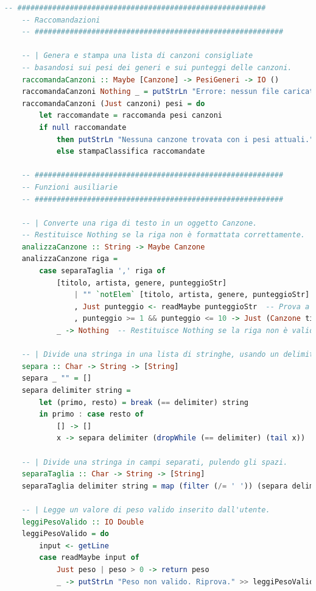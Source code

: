 \documentclass[a4paper,11pt]{article}
\begin{document}
\begin{lstlisting}[language=Haskell,caption=raccomandazioni.hs]
    -- #########################################################
    -- Raccomandazioni
    -- #########################################################
    
    -- | Genera e stampa una lista di canzoni consigliate
    -- basandosi sui pesi dei generi e sui punteggi delle canzoni.
    raccomandaCanzoni :: Maybe [Canzone] -> PesiGeneri -> IO ()
    raccomandaCanzoni Nothing _ = putStrLn "Errore: nessun file caricato. Carica un file prima di continuare."
    raccomandaCanzoni (Just canzoni) pesi = do
        let raccomandate = raccomanda pesi canzoni
        if null raccomandate
            then putStrLn "Nessuna canzone trovata con i pesi attuali."
            else stampaClassifica raccomandate
    
    -- #########################################################
    -- Funzioni ausiliarie
    -- #########################################################
    
    -- | Converte una riga di testo in un oggetto Canzone.
    -- Restituisce Nothing se la riga non è formattata correttamente.
    analizzaCanzone :: String -> Maybe Canzone
    analizzaCanzone riga =
        case separaTaglia ',' riga of
            [titolo, artista, genere, punteggioStr]
                | "" `notElem` [titolo, artista, genere, punteggioStr]  -- Controlla che tutte le parti siano non vuote
                , Just punteggio <- readMaybe punteggioStr  -- Prova a leggere il punteggio
                , punteggio >= 1 && punteggio <= 10 -> Just (Canzone titolo artista genere punteggio)  -- Verifica che il punteggio sia valido
            _ -> Nothing  -- Restituisce Nothing se la riga non è valida
    
    -- | Divide una stringa in una lista di stringhe, usando un delimitatore.
    separa :: Char -> String -> [String]
    separa _ "" = []
    separa delimiter string =
        let (primo, resto) = break (== delimiter) string
        in primo : case resto of
            [] -> []
            x -> separa delimiter (dropWhile (== delimiter) (tail x))
    
    -- | Divide una stringa in campi separati, pulendo gli spazi.
    separaTaglia :: Char -> String -> [String]
    separaTaglia delimiter string = map (filter (/= ' ')) (separa delimiter string)
    
    -- | Legge un valore di peso valido inserito dall'utente.
    leggiPesoValido :: IO Double
    leggiPesoValido = do
        input <- getLine
        case readMaybe input of
            Just peso | peso > 0 -> return peso
            _ -> putStrLn "Peso non valido. Riprova." >> leggiPesoValido
    

\end{lstlisting}
\end{document}
